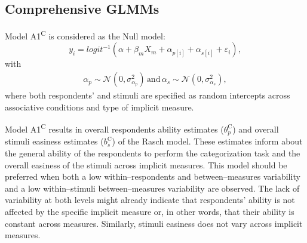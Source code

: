 \documentclass[12pt]{book}
\begin{document}

\subsection{Comprehensive GLMMs}\label{sec:cglmms}

Model A1\textsuperscript{C} is considered as the Null model: 
%
\begin{equation}\label{eq:typeNull}
	y_{i} = logit^{-1}(\alpha + \beta_mX_m + \alpha_{p[i]} +  \alpha_{s[i]} + \varepsilon_{i}),
\end{equation}
with
\begin{align}
	\alpha_{p} \sim  \mathcal{N} ( 0, \sigma_{\alpha_p}^2) \, \text{and}  \,	\alpha_{s}  \sim  \mathcal{N} (0,\sigma_{\alpha_s}^2),
\end{align}
where both respondents' and stimuli are specified as random intercepts across associative conditions and type of implicit measure. 

Model A1\textsuperscript{C} results in overall respondents ability estimates ($\theta_{p}^\text{C}$) and overall stimuli easiness estimates ($b_{s}^\text{C}$) of the Rasch model. 
These estimates inform about the general ability of the respondents to perform the categorization task and the overall easiness of the stimuli across implicit measures. This model should be preferred when both a low within--respondents and between--measures variability and a low within--stimuli between--measures variability are observed. 
The lack of variability at both levels might already indicate that respondents' ability is not affected by the specific implicit measure or, in other words, that their ability is constant across measures. 
Similarly, stimuli easiness does not vary across implicit measures.
\end{document}
